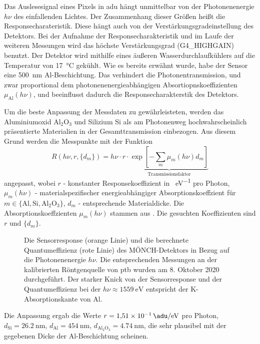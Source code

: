 \noindent
Das Auslesesignal eines Pixels in \gls{adu} hängt unmittelbar von der Photonenenergie $h\nu$ des einfallenden Lichtes. Der Zusammenhang dieser Größen heißt die Responsecharateristik. Diese hängt auch von der Verstärkungsgradeinstellung des Detektors. Bei der Aufnahme der Responsecharakteristik und im Laufe der weiteren Messungen wird das höchste Verstärkungsgrad (G4\_HIGHGAIN) benutzt. Der Detektor wird mithilfe eines äußeren Wasserdurchlaufkühlers auf die Temperatur von \SI{17}{\celsius} gekühlt. Wie es bereits erwähnt wurde, habe der Sensor eine \SI{500}{\nano\meter} Al-Beschichtung. Das verhindert die Photonentransmission, und zwar proportional dem photonenenergieabhängigen Absortiopnskoeffizienten $\mu_\text{Al}(h\nu)$, und beeinflusst dadurch die Responsecharakterstik des Detektors.
%     

\noindent
Um die beste Anpassung der Messdaten zu gewährleisteten, werden das Aluminiumoxid Al$_2$O$_3$ und Silizium Si als am Photonenweg hochwahrscheinlich präsentierte Materialien in der Gesamttransmission einbezogen. Aus diesem Grund werden die Messpunkte mit der Funktion
\begin{equation}
    R(h\nu, r, \{d_m\}) = h\nu\cdot r\cdot\underbrace{\exp\left[-\sum_{m}\mu_m(h\nu)d_m\right]}_{\text{Transmissionsfaktor}}
\label{eq:response_durchschnitt}
\end{equation}
angepasst, wobei $r$ - konstanter Responsekoeffizient in \si{\adu\per\eV} pro Photon, $\mu_m(h\nu)$ - materialspezifischer energieabhängiger Absorptionskoeffzient für $m \in \{\text{Al}, \text{Si}, \text{Al$_2$O$_3$}\}$,  $d_m$ - entsprechende Materialdicke. Die Absorptionskoeffzienten $\mu_m(h\nu)$ stammen aus \cite{xray-coeffs}. Die gesuchten Koeffizienten sind $r$ und $\{d_m\}$.
\begin{figure}[H]
    \centering
    
    \caption{Die Sensorresponse (orange Linie) und die berechnete Quantumeffizienz (rote Linie) des MÖNCH-Detektors in Bezug auf die Photonenenergie $h\nu$. Die entsprechenden Messungen an der kalibrierten Röntgenquelle von \gls{ptb} wurden am 8. Oktober 2020 durchgeführt. Der starker Knick von der Sensorresponse und der Quantumeffizienz bei der $h\nu \approx \SI{1559}{\eV}$ entspricht der K-Absorptionskante von Al.}
    \label{fig:response_moench}
\end{figure}
\noindent
Die Anpassung ergab die Werte
$r = \SI{1.51e-1}{\adu\per\eV}$ pro Photon, $d_\text{Si} = \SI{26.2}{\nano\meter}$, $d_\text{Al} = \SI{454}{\nano\meter}$,
$d_\text{Al$_2$O$_3$} = \SI{4.74}{\nano\meter}$, die sehr plausibel mit der gegebenen Dicke der Al-Beschichtung scheinen.

